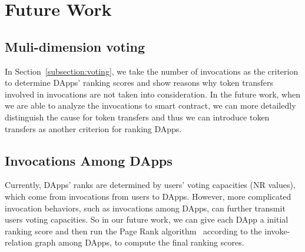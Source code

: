 \section{Future Work}
\subsection{Muli-dimension voting}
In Section~\ref{subsection:voting}, we take the number of invocations as the criterion to determine DApps' ranking scores and show reasons why token transfers involved in invocations are not taken into consideration. In the future work, when we are able to analyze the invocations to smart contract, we can more detailedly distinguish the cause for token transfers and thus we can introduce token transfers as another criterion for ranking DApps.

\subsection{Invocations Among DApps}
Currently, DApps' ranks are determined by users' voting capacities (NR values), which come from invocations from users to DApps. However, more complicated invocation behaviors, such as invocations among DApps, can further transmit users voting capacities. So in our future work, we can give each DApp a initial ranking score and then run the Page Rank algorithm~\cite{page1999pagerank} according to the invoke-relation graph among DApps, to compute the final ranking scores.
